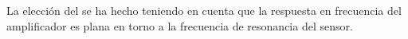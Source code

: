 La elección del  se ha hecho teniendo en cuenta que la
respuesta en frecuencia del amplificador es plana en torno a la frecuencia
de resonancia del sensor.

%
%
%



